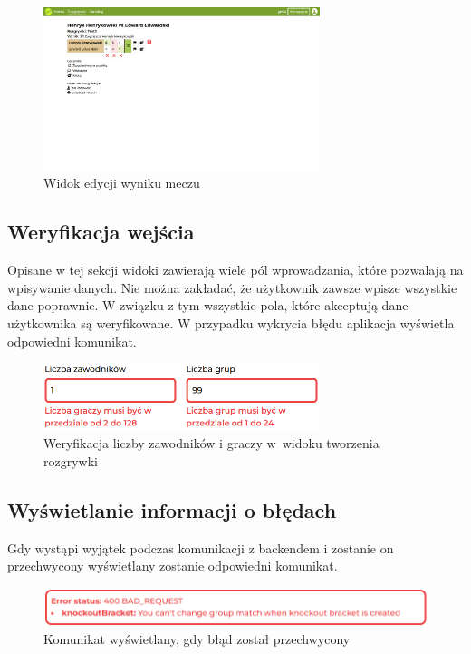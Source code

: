 \documentclass[shortabstract]{iithesis}
\begin{document}
\begin{figure}[H]
    \centering
    \includegraphics[width=0.72\textwidth,valign=t]{assets/interfejs/mecz_desktop.png}
    \caption{Widok edycji wyniku meczu}
\end{figure}

\subsection{Weryfikacja wejścia}
Opisane w tej sekcji widoki zawierają wiele pól wprowadzania, które pozwalają na wpisywanie danych.
Nie można zakładać, że użytkownik zawsze wpisze wszystkie dane poprawnie.
W związku z tym wszystkie pola, które akceptują dane użytkownika są weryfikowane.
W przypadku wykrycia błędu aplikacja wyświetla odpowiedni komunikat.
\begin{figure}[H]
    \centering
    \includegraphics[width=0.72\textwidth,valign=t]{assets/interfejs/weryfikacja_wejscia.png}
    \caption{Weryfikacja liczby zawodników i graczy w~widoku tworzenia rozgrywki}
\end{figure}

\subsection{Wyświetlanie informacji o błędach}
Gdy wystąpi wyjątek podczas komunikacji z backendem i zostanie on przechwycony wyświetlany zostanie odpowiedni komunikat.
\begin{figure}[H]
    \centering
    \includegraphics[width=\textwidth,valign=t]{assets/interfejs/rozgrywki_error.png}
    \caption{Komunikat wyświetlany, gdy błąd został przechwycony}
\end{figure}
\end{document}
